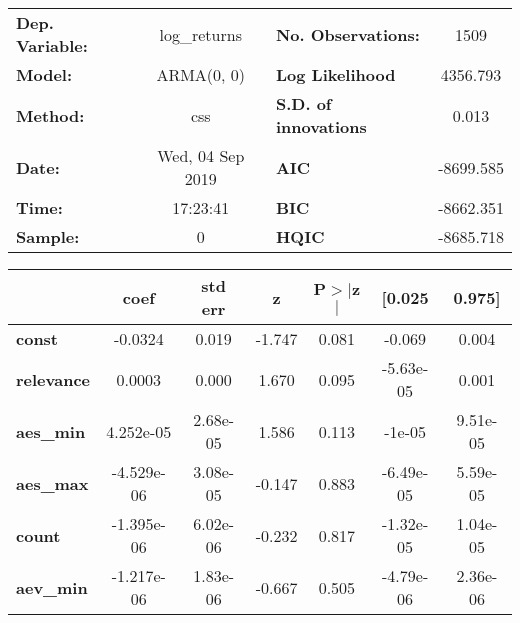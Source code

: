 \begin{center}
\begin{tabular}{lclc}
\toprule
\textbf{Dep. Variable:} &   log\_returns   & \textbf{  No. Observations:  } &    1509     \\
\textbf{Model:}         &    ARMA(0, 0)    & \textbf{  Log Likelihood     } &  4356.793   \\
\textbf{Method:}        &       css        & \textbf{  S.D. of innovations} &   0.013     \\
\textbf{Date:}          & Wed, 04 Sep 2019 & \textbf{  AIC                } & -8699.585   \\
\textbf{Time:}          &     17:23:41     & \textbf{  BIC                } & -8662.351   \\
\textbf{Sample:}        &        0         & \textbf{  HQIC               } & -8685.718   \\
\bottomrule
\end{tabular}
\begin{tabular}{lcccccc}
                   & \textbf{coef} & \textbf{std err} & \textbf{z} & \textbf{P$> |$z$|$} & \textbf{[0.025} & \textbf{0.975]}  \\
\midrule
\textbf{const}     &      -0.0324  &        0.019     &    -1.747  &         0.081        &       -0.069    &        0.004     \\
\textbf{relevance} &       0.0003  &        0.000     &     1.670  &         0.095        &    -5.63e-05    &        0.001     \\
\textbf{aes\_min}  &    4.252e-05  &     2.68e-05     &     1.586  &         0.113        &       -1e-05    &     9.51e-05     \\
\textbf{aes\_max}  &   -4.529e-06  &     3.08e-05     &    -0.147  &         0.883        &    -6.49e-05    &     5.59e-05     \\
\textbf{count}     &   -1.395e-06  &     6.02e-06     &    -0.232  &         0.817        &    -1.32e-05    &     1.04e-05     \\
\textbf{aev\_min}  &   -1.217e-06  &     1.83e-06     &    -0.667  &         0.505        &    -4.79e-06    &     2.36e-06     \\
\bottomrule
\end{tabular}
\end{center}
